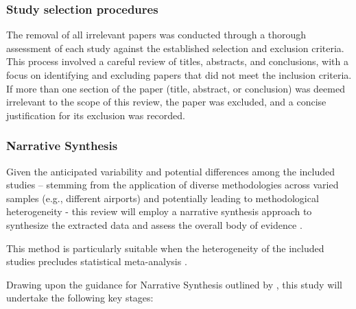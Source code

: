 \subsubsection{Study selection procedures}

The removal of all irrelevant papers was conducted through a thorough assessment
of each study against the established selection and exclusion criteria.
%
This process involved a careful review of titles, abstracts, and conclusions,
with a focus on identifying and excluding papers that did not meet the inclusion
criteria.
%
If more than one section of the paper (title, abstract, or conclusion) was
deemed irrelevant to the scope of this review, the paper was excluded, and a
concise justification for its exclusion was recorded.



\subsubsection{Narrative Synthesis}

Given the anticipated variability and potential differences among the included
studies – stemming from the application of diverse methodologies across varied
samples (e.g., different airports) and potentially leading to methodological
heterogeneity - this review will employ a narrative synthesis approach to
synthesize the extracted data and assess the overall body of evidence
\cite{campbell2018improving, campbell2019lack}.
%

 
This method is particularly suitable when the heterogeneity of the included
studies precludes statistical meta-analysis \cite{popay2006guidance,
campbell2018improving, campbell2019lack}.
%

 
Drawing upon the guidance for Narrative Synthesis outlined by
, this study will undertake the following key
stages: 

